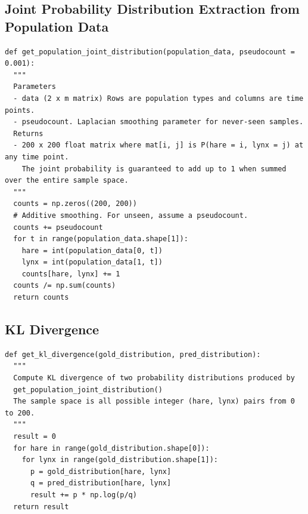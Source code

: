 \documentclass[letterpaper, 10 pt, conference]{ieeeconf}  %
\begin{document}
\subsection*{Joint Probability Distribution Extraction from Population Data}
\begin{verbatim}
def get_population_joint_distribution(population_data, pseudocount = 0.001):
  """
  Parameters
  - data (2 x m matrix) Rows are population types and columns are time points.
  - pseudocount. Laplacian smoothing parameter for never-seen samples.
  Returns
  - 200 x 200 float matrix where mat[i, j] is P(hare = i, lynx = j) at any time point.
    The joint probability is guaranteed to add up to 1 when summed over the entire sample space.
  """
  counts = np.zeros((200, 200))
  # Additive smoothing. For unseen, assume a pseudocount.
  counts += pseudocount
  for t in range(population_data.shape[1]):
    hare = int(population_data[0, t])
    lynx = int(population_data[1, t])
    counts[hare, lynx] += 1
  counts /= np.sum(counts)
  return counts
\end{verbatim}

\subsection*{KL Divergence}
\begin{verbatim}
def get_kl_divergence(gold_distribution, pred_distribution):
  """
  Compute KL divergence of two probability distributions produced by
  get_population_joint_distribution()
  The sample space is all possible integer (hare, lynx) pairs from 0 to 200.
  """
  result = 0
  for hare in range(gold_distribution.shape[0]):
    for lynx in range(gold_distribution.shape[1]):
      p = gold_distribution[hare, lynx]
      q = pred_distribution[hare, lynx]
      result += p * np.log(p/q)
  return result
\end{verbatim}
\end{document}

